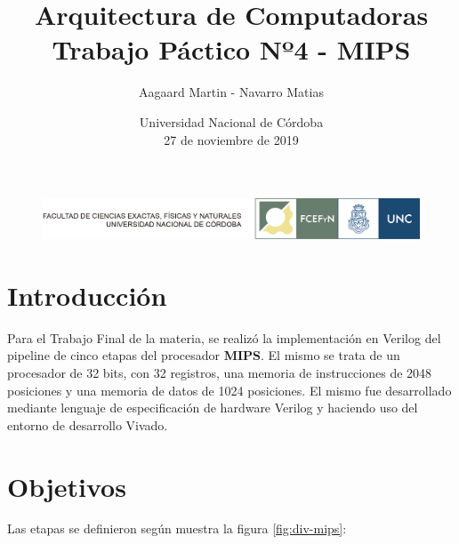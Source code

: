 \documentclass[12pt,A4paper,titlepage]{article}
\begin{document}
\renewcommand{\tablename}{Tabla}
\large

\title{Arquitectura de Computadoras \\
\large Trabajo Páctico Nº4 - MIPS}
\author{Aagaard Martin - Navarro Matias
\bigskip
\bigskip}

\date{Universidad Nacional de Córdoba \\ 27 de noviembre de 2019}

\begin{titlepage}
\center


\begin{figure}[h]
    \centering
    \includegraphics[scale=0.8]{figure/logos-fcefyn-y-unc.png}
    \label{fig:unc-logo}
\end{figure}

{\let\newpage\relax\maketitle}
\center
\end{titlepage}

\maketitle %
\tableofcontents %
\newpage

\section{Introducción}
Para el Trabajo Final de la materia, se realizó la implementación en Verilog del pipeline de cinco etapas del procesador \textbf{MIPS}. El mismo se trata de un procesador de 32 bits, con 32 registros, una memoria de instrucciones de 2048 posiciones y una memoria de datos de 1024 posiciones.
El mismo fue desarrollado mediante lenguaje de especificación de hardware Verilog y haciendo uso del entorno de desarrollo Vivado.



\section{Objetivos}
\noindent Las etapas se definieron según muestra la figura \ref{fig:div-mips}:
\end{document}
